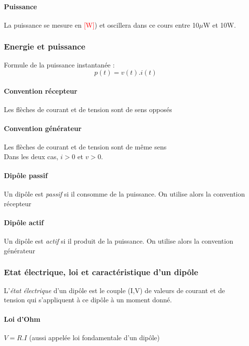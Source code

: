 \documentclass[a4paper]{article}
\begin{document}
    \paragraph{Puissance} La puissance se mesure en \textcolor{red}{[W]}) et
    oscillera dans ce cours entre 10$\mu$W et 10W.

    \subsubsection{Energie et puissance}
    Formule de la puissance instantanée : $$ p(t) = v(t).i(t) $$

    \paragraph{Convention récepteur} Les flèches de courant et de tension sont
    de sens opposés

    \paragraph{Convention générateur} Les flèches de courant et de tension sont
    de même sens\\

    Dans les deux cas, $i>0$ et $v>0$.

    \paragraph{Dipôle passif} Un dipôle est \textit{passif} si il consomme de la puissance. On utilise alors la convention récepteur

    \paragraph{Dipôle actif} Un dipôle est \textit{actif} si il produit de la puissance. On utilise alors la convention générateur

    \subsubsection{Etat électrique, loi et caractéristique d'un dipôle}
    L'\textit{état électrique} d'un dipôle est le couple (I,V) de valeurs de
    courant et de tension qui s'appliquent à ce dipôle à un moment donné.

    \paragraph{Loi d'Ohm} $V = R.I$ (aussi appelée loi fondamentale d'un dipôle)
\end{document}
